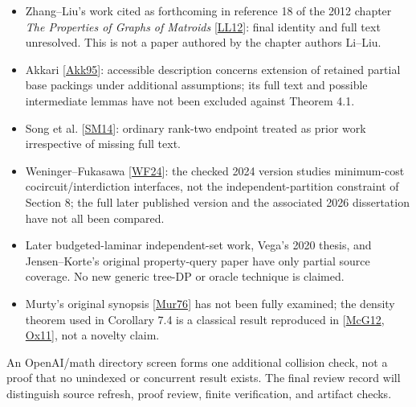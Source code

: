 \documentclass[11pt]{article}
\begin{document}
\begin{itemize}
\item Zhang--Liu's work cited as forthcoming in reference 18 of the 2012 chapter \emph{The Properties of Graphs of Matroids} [\hyperlink{refLL12}{LL12}]: final identity and full text unresolved. This is not a paper authored by the chapter authors Li--Liu.
\item Akkari [\hyperlink{refAkk95}{Akk95}]: accessible description concerns extension of retained partial base packings under additional assumptions; its full text and possible intermediate lemmas have not been excluded against Theorem 4.1.
\item Song et al. [\hyperlink{refSM14}{SM14}]: ordinary rank-two endpoint treated as prior work irrespective of missing full text.
\item Weninger--Fukasawa [\hyperlink{refWF24}{WF24}]: the checked 2024 version studies minimum-cost cocircuit/interdiction interfaces, not the independent-partition constraint of Section 8; the full later published version and the associated 2026 dissertation have not all been compared.
\item Later budgeted-laminar independent-set work, Vega's 2020 thesis, and Jensen--Korte's original property-query paper have only partial source coverage. No new generic tree-DP or oracle technique is claimed.
\item Murty's original synopsis [\hyperlink{refMur76}{Mur76}] has not been fully examined; the density theorem used in Corollary 7.4 is a classical result reproduced in [\hyperlink{refMcG12}{McG12}, \hyperlink{refOx11}{Ox11}], not a novelty claim.

\end{itemize}
An OpenAI/math directory screen forms one additional collision check, not a proof that no unindexed or concurrent result exists. The final review record will distinguish source refresh, proof review, finite verification, and artifact checks.
\end{document}
